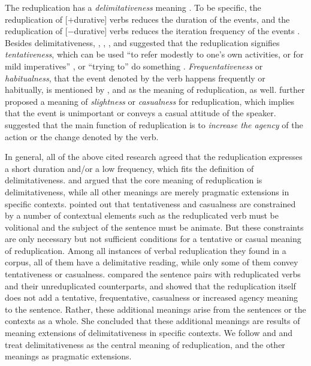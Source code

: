 The reduplication has a \textit{delimitativeness} meaning \citep[e.g.][]{Chao1968, Chen2001, Dai1997, Li1996, LiThompson1981, Tsao2001, XiaoMcEnery2004, Xing2000, Yang2003, Zhu1998}. 
To be specific, the reduplication of [$+$durative] verbs reduces the duration of the events,
and the reduplication of [$-$durative] verbs reduces the iteration frequency of the events \citetext{\citealp[14]{Li1996}; \citealp[149--150]{XiaoMcEnery2004}}.
Besides delimitativeness, \citet{Chao1968}, \citet{Fan1964}, \citet{Li1996}, \citet{Smith1991, Smith1994} and \citet{Tsao2001} suggested that the reduplication signifies \textit{tentativeness}, which can be used
``to refer modestly to one's own activities, or for mild imperatives'' \citep[356]{Smith1991}, or ``trying to'' do something \citep[234]{LiThompson1981}.
\textit{Frequentativeness} or \textit{habitualness}, that the event denoted by the verb happens frequently or habitually, is mentioned by \citet{Fan1964}, \citet{Li1996} and \citet{Qian2000} as the meaning of reduplication, as well.
 \citet{Fan1964} further proposed a meaning of \textit{slightness} or \textit{casualness} for reduplication, which implies that the event is unimportant or conveys a casual attitude of the speaker.
 \citet{Zhu1998} suggested that the main function of reduplication is to \textit{increase the agency} of the action or the change denoted by the verb.


In general, all of the above cited research agreed that the reduplication expresses a short duration and/or a low frequency, which fits the definition of delimitativeness.
\citet[152--154]{XiaoMcEnery2004} and \citet{Yang2003} argued that the core meaning of reduplication is delimitativeness, 
while all other meanings are merely pragmatic extensions  in specific contexts.
\citet[152--154]{XiaoMcEnery2004} pointed out that tentativeness and casualness are constrained by a number of contextual elements 
such as the reduplicated verb must be volitional and the subject of the sentence must be animate.
But these constraints are only necessary but not sufficient conditions for a tentative or casual meaning of reduplication.
Among all instances of verbal reduplication they found in a corpus, all of them have a delimitative reading, while only some of them convey tentativeness or casualness.
\citet{Yang2003} compared the sentence pairs with reduplicated verbs and their unreduplicated counterparts,
and showed that the reduplication itself does not add a tentative, frequentative, casualness or increased agency meaning to the sentence.
Rather, these additional meanings arise from the sentences or the contexts as a whole.
She concluded that these additional meanings are results of meaning extensions of delimitativeness in specific contexts.
We follow \citet{XiaoMcEnery2004} and \citet{Yang2003} and treat delimitativeness as the central meaning of reduplication,
and the other meanings as pragmatic extensions.

